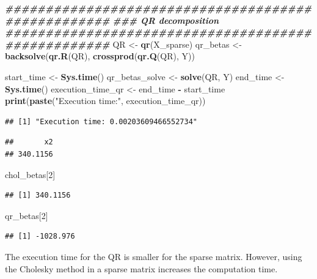 \documentclass[
]{article}
\newenvironment{Shaded}{\begin{snugshade}}{\end{snugshade}}
\newcommand{\DecValTok}[1]{\textcolor[rgb]{0.00,0.00,0.81}{#1}}
\newcommand{\DocumentationTok}[1]{\textcolor[rgb]{0.56,0.35,0.01}{\textbf{\textit{#1}}}}
\newcommand{\FunctionTok}[1]{\textcolor[rgb]{0.13,0.29,0.53}{\textbf{#1}}}
\newcommand{\NormalTok}[1]{#1}
\newcommand{\OtherTok}[1]{\textcolor[rgb]{0.56,0.35,0.01}{#1}}
\newcommand{\SpecialCharTok}[1]{\textcolor[rgb]{0.81,0.36,0.00}{\textbf{#1}}}
\newcommand{\StringTok}[1]{\textcolor[rgb]{0.31,0.60,0.02}{#1}}
\begin{document}
\begin{Shaded}
\begin{Highlighting}[]
\DocumentationTok{\#\#\#\#\#\#\#\#\#\#\#\#\#\#\#\#\#\#\#\#\#\#\#\#\#\#\#\#\#\#\#\#\#\#\#\#\#\#\#\#\#\#\#\#\#\#\#\#\#\#\#}
\DocumentationTok{\#\#\# QR decomposition}
\DocumentationTok{\#\#\#\#\#\#\#\#\#\#\#\#\#\#\#\#\#\#\#\#\#\#\#\#\#\#\#\#\#\#\#\#\#\#\#\#\#\#\#\#\#\#\#\#\#\#\#\#\#\#\#}
\NormalTok{QR }\OtherTok{\textless{}{-}} \FunctionTok{qr}\NormalTok{(X\_sparse)}
\NormalTok{qr\_betas }\OtherTok{\textless{}{-}} \FunctionTok{backsolve}\NormalTok{(}\FunctionTok{qr.R}\NormalTok{(QR), }\FunctionTok{crossprod}\NormalTok{(}\FunctionTok{qr.Q}\NormalTok{(QR), Y))}



\NormalTok{start\_time }\OtherTok{\textless{}{-}} \FunctionTok{Sys.time}\NormalTok{()}
\NormalTok{qr\_betas\_solve }\OtherTok{\textless{}{-}} \FunctionTok{solve}\NormalTok{(QR, Y)}
\NormalTok{end\_time }\OtherTok{\textless{}{-}} \FunctionTok{Sys.time}\NormalTok{()}
\NormalTok{execution\_time\_qr }\OtherTok{\textless{}{-}}\NormalTok{ end\_time }\SpecialCharTok{{-}}\NormalTok{ start\_time}
\FunctionTok{print}\NormalTok{(}\FunctionTok{paste}\NormalTok{(}\StringTok{"Execution time:"}\NormalTok{, execution\_time\_qr))}
\end{Highlighting}
\end{Shaded}

\begin{verbatim}
## [1] "Execution time: 0.00203609466552734"
\end{verbatim}

\begin{Shaded}
\end{Shaded}

\begin{verbatim}
##       x2 
## 340.1156
\end{verbatim}

\begin{Shaded}
\begin{Highlighting}[]
\NormalTok{chol\_betas[}\DecValTok{2}\NormalTok{]}
\end{Highlighting}
\end{Shaded}

\begin{verbatim}
## [1] 340.1156
\end{verbatim}

\begin{Shaded}
\begin{Highlighting}[]
\NormalTok{qr\_betas[}\DecValTok{2}\NormalTok{]}
\end{Highlighting}
\end{Shaded}

\begin{verbatim}
## [1] -1028.976
\end{verbatim}

The execution time for the QR is smaller for the sparse matrix. However,
using the Cholesky method in a sparse matrix increases the computation
time.
\end{document}
